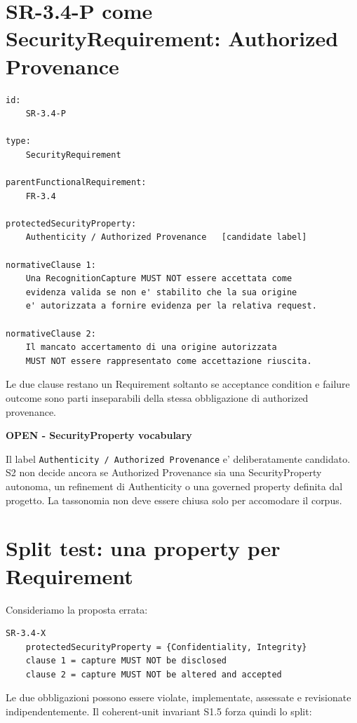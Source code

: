 \documentclass[11pt,a4paper]{article}
\newenvironment{warningbox}[1]{%
  \def\FrameCommand{\fcolorbox{ddtaorange}{ddtagray}}%
  \MakeFramed{\advance\hsize-2\width\FrameRestore}
  \noindent\textbf{#1}\par\smallskip
}{\endMakeFramed}
\begin{document}
\section{SR-3.4-P come SecurityRequirement: Authorized Provenance}

\begin{lstlisting}
id:
    SR-3.4-P

type:
    SecurityRequirement

parentFunctionalRequirement:
    FR-3.4

protectedSecurityProperty:
    Authenticity / Authorized Provenance   [candidate label]

normativeClause 1:
    Una RecognitionCapture MUST NOT essere accettata come
    evidenza valida se non e' stabilito che la sua origine
    e' autorizzata a fornire evidenza per la relativa request.

normativeClause 2:
    Il mancato accertamento di una origine autorizzata
    MUST NOT essere rappresentato come accettazione riuscita.
\end{lstlisting}

Le due clause restano un Requirement soltanto se acceptance condition e failure outcome sono parti inseparabili della stessa obbligazione di authorized provenance.

\begin{warningbox}{OPEN - SecurityProperty vocabulary}
Il label \texttt{Authenticity / Authorized Provenance} e' deliberatamente candidato. S2 non decide ancora se Authorized Provenance sia una SecurityProperty autonoma, un refinement di Authenticity o una governed property definita dal progetto. La tassonomia non deve essere chiusa solo per accomodare il corpus.
\end{warningbox}

\section{Split test: una property per Requirement}

Consideriamo la proposta errata:

\begin{lstlisting}
SR-3.4-X
    protectedSecurityProperty = {Confidentiality, Integrity}
    clause 1 = capture MUST NOT be disclosed
    clause 2 = capture MUST NOT be altered and accepted
\end{lstlisting}

Le due obbligazioni possono essere violate, implementate, assessate e revisionate indipendentemente. Il coherent-unit invariant S1.5 forza quindi lo split:
\end{document}
